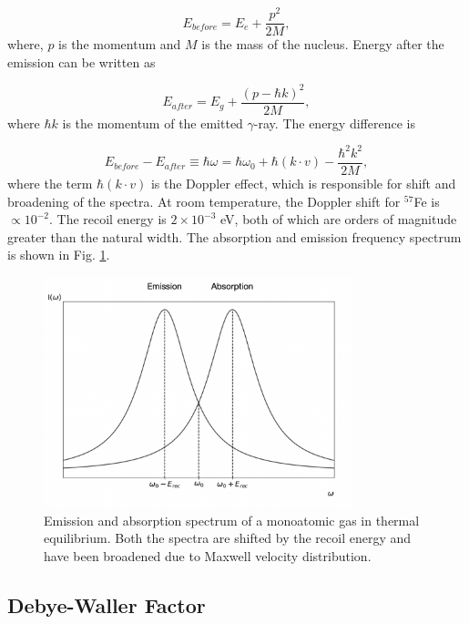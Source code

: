 \documentclass[a4paper]{report}
\numberwithin{equation}{section}
\begin{document}
\begin{equation}
		E_{before} = E_{e} + \frac{p^2}{2M},
\end{equation}
where, $p$ is the momentum and $M$ is the mass of the nucleus. Energy after the emission can be written as

\begin{equation}
		E_{after} = E_{g} + \frac{(p - \hbar k)^2}{2M},
\end{equation}
where $\hbar k$ is the momentum of the emitted $\gamma$-ray. The energy difference is 

\begin{equation}
		E_{before} - E_{after} \equiv \hbar \omega = \hbar \omega_{0} + \hbar (k \cdot v) - \frac{\hbar ^2 k^2}{2M},
\end{equation}
where the term $\hbar (k \cdot v)$ is the Doppler effect, which is responsible for shift and broadening of the spectra. At room temperature, the Doppler shift for $^{57}$Fe is $\propto 10^{-2}$. The recoil energy  is $2 \times 10^{-3}$ eV, both of which are orders of magnitude greater than the natural width. The absorption and emission frequency spectrum is shown in Fig. \ref{fig:doppler}.

\begin{figure}[htpb]
    \centering
    \includegraphics[width=0.8\textwidth]{doppler}
    \caption{Emission and absorption spectrum of a monoatomic gas in thermal equilibrium. Both the spectra are shifted by the recoil energy and have been broadened due to Maxwell velocity distribution.}
    \label{fig:doppler}
\end{figure}


\subsection{Debye-Waller Factor}
\end{document}
